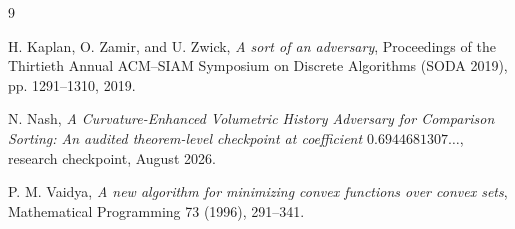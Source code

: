 \documentclass[11pt]{article}
\theoremstyle{definition}
\newcommand{\1}{\mathbf{1}}
\begin{document}
\begin{thebibliography}{9}

H. Kaplan, O. Zamir, and U. Zwick,
\newblock \emph{A sort of an adversary},
\newblock Proceedings of the Thirtieth Annual ACM--SIAM Symposium on Discrete Algorithms (SODA 2019), pp. 1291--1310, 2019.

N. Nash,
\newblock \emph{A Curvature-Enhanced Volumetric History Adversary for Comparison Sorting: An audited theorem-level checkpoint at coefficient $0.6944681307\ldots$},
\newblock research checkpoint, August 2026.

P. M. Vaidya,
\newblock \emph{A new algorithm for minimizing convex functions over convex sets},
\newblock Mathematical Programming 73 (1996), 291--341.

\end{thebibliography}
\end{document}
